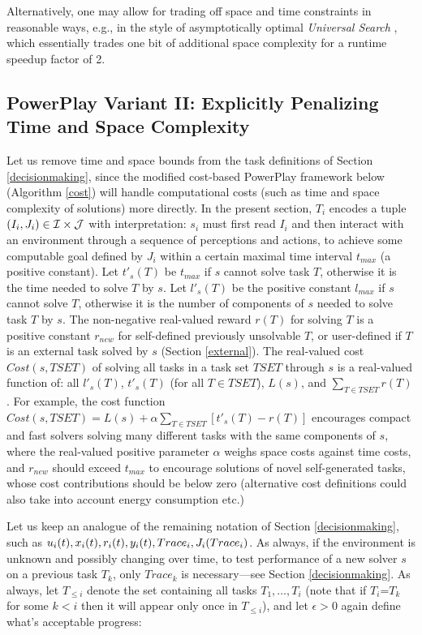 \documentclass{article}
\begin{document}
Alternatively, one may allow for trading off space and time constraints in reasonable ways, e.g., in
the style of asymptotically optimal {\em Universal Search} \cite{Levin:73}, which essentially  trades one bit of 
additional space complexity for a runtime speedup factor of 2. 

\subsection{{\sc PowerPlay} Variant II: Explicitly Penalizing Time and Space Complexity}
\label{costsection}

Let us remove time and space bounds from the task definitions of Section \ref{decisionmaking},  
since the modified cost-based {\sc PowerPlay} framework below (Algorithm \ref{cost}) will handle 
computational costs (such as time and space complexity of solutions) more directly.
In the present section, $T_i$ encodes a tuple $(I_i, J_i)\in \cal I \times \cal J$ 
with interpretation:
$s_i$ must  first read $I_i$ 
and then interact with an environment through a sequence of perceptions and actions,
to achieve some computable goal defined by $J_i$ within a certain maximal time interval $t_{max}$ (a positive constant).
Let $t'_s(T)$  be  $t_{max}$ if $s$ cannot solve task $T$, otherwise it is the time needed to solve $T$ by $s$.
Let $l'_s(T)$  be the positive constant $l_{max}$ if $s$ cannot solve $T$, 
otherwise it is the number of components of $s$ needed to solve task $T$ by $s$.
The non-negative real-valued reward $r(T)$ for solving $T$  is a positive constant $r_{new}$ for self-defined 
previously unsolvable $T$,
or user-defined if  $T$ is an external task solved by $s$ (Section \ref{external}). 
The real-valued cost $Cost(s, TSET)$ of solving all tasks in a  task set $TSET$  through $s$
is a real-valued function of:  all $l'_s(T)$, $t'_s(T)$ (for all $T \in TSET$), $L(s)$,
 and $\sum_{T \in TSET} r(T)$.
For example, the cost function  $Cost(s, TSET)=  L(s) +  \alpha \sum_{T \in TSET} [ t'_s(T)-r(T)]$
encourages compact and fast solvers solving many different tasks with the same components of $s$,
where the real-valued positive parameter $\alpha$ weighs space costs against time costs, and
$r_{new}$ should exceed $t_{max}$ to encourage solutions of novel self-generated tasks,
whose cost contributions should be below zero
(alternative cost definitions could also take into account energy consumption etc.)

Let us keep an analogue of the remaining notation of Section \ref{decisionmaking},
such as $u_i(t),x_i(t), r_i(t),y_i(t),Trace_i,\\ J_i (Trace_i)$. As always, if the environment 
is unknown and possibly changing over time, to test performance 
of a new solver $s$ on a previous task $T_k$, only $Trace_k$ is necessary---see Section \ref{decisionmaking}.
As always, let $T_{\leq i}$ denote the set containing all tasks $T_1, \ldots, T_i$ (note that if $T_i$=$T_k$ for 
some $k<i$ then it will appear only once in $T_{\leq i}$), and
let  $\epsilon>0$ again define what's acceptable progress:
\end{document}
